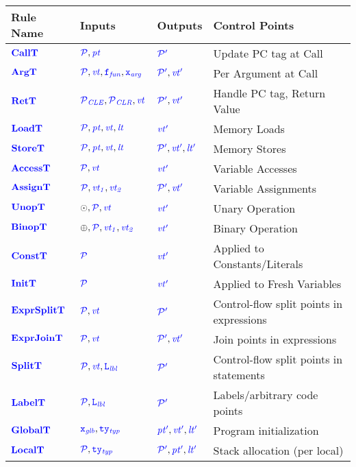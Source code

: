 \documentclass{llncs}
\begin{document}
\begin{table}[t]
  \begin{tabular}{|l|l|l|l|}
    \hline
    Rule Name & Inputs & Outputs & Control Points \\
    \hline
    \(\calltname\)      & \(\calltargs\)         & \(\calltres\)      & Update PC tag at Call \\
    \(\argtname\)       & \(\argtargs\)          & \(\argtres\)       & Per Argument at Call \\
    \(\rettname\)       & \(\rettargs\)          & \(\rettres\)       & Handle PC tag, Return Value \\
    \(\loadtname\)      & \(\loadtargs\)         & \(\loadtres\)      & Memory Loads \\
    \(\storetname\)     & \(\storetargs\)        & \(\storetres\)     & Memory Stores \\
    \(\accesstname\)    & \(\accesstargs\)       & \(\accesstres\)    & Variable Accesses \\
    \(\assigntname\)    & \(\assigntargs\)       & \(\assigntres\)    & Variable Assignments \\
    \(\unoptname\)      & \(\unoptargs\)         & \(\unoptres\)      & Unary Operation \\
    \(\binoptname\)     & \(\binoptargs\)        & \(\binoptres\)     & Binary Operation \\
    \(\consttname\)     & \(\consttargs\)        & \(\consttres\)     & Applied to Constants/Literals \\
    \(\inittname\)      & \(\inittargs\)         & \(\inittres\)      & Applied to Fresh Variables \\
    \(\exprsplittname\) & \(\exprsplittargs\)    & \(\exprsplittres\) & Control-flow split points in expressions \\
    \(\exprjointname\)  & \(\exprjointargs\)     & \(\exprjointres\)  & Join points in expressions \\
    \(\splittname\)     & \(\splittargs\)        & \(\splittres\)     & Control-flow split points in statements\\
    \(\labeltname\)     & \(\labeltargs\)        & \(\labeltres\)     & Labels/arbitrary code points \\
    \(\globaltname\)    & \(\globaltargs\)       & \(\globaltres\)    & Program initialization \\
    \(\localtname\)     & \(\localtargs\)        & \(\localtres\)     & Stack allocation (per local) \\

\end{tabular}
\end{table}
\end{document}
